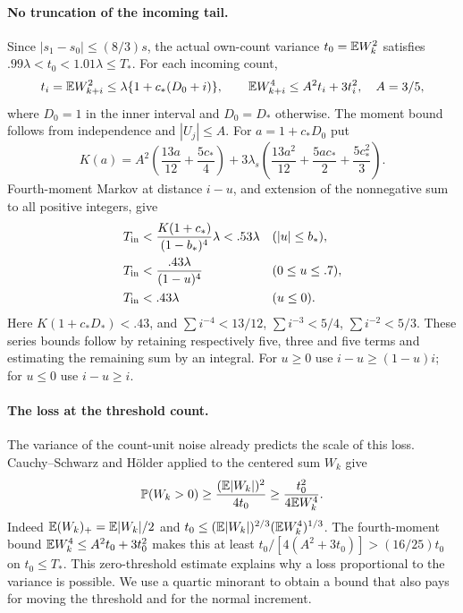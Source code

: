 \paragraph{No truncation of the incoming tail.}
Since $|s_1-s_0|\le(8/3)s$, the actual own-count variance
$t_0=\mathbb E W_k^2$ satisfies
$.99\lambda<t_0<1.01\lambda\le T_*$.
For each incoming count,
\[
 t_i=\mathbb E W_{k+i}^2\le\lambda\{1+c_*(D_0+i)\},\qquad
 \mathbb E W_{k+i}^4\le A^2t_i+3t_i^2,\quad A=3/5,
\]
where $D_0=1$ in the inner interval and $D_0=D_*$ otherwise.
The moment bound follows from independence and $|U_j|\le A$.
For $a=1+c_*D_0$ put
\[
 K(a)=A^2\left(\frac{13a}{12}+\frac{5c_*}{4}\right)
 +3\lambda_s\left(\frac{13a^2}{12}+\frac{5ac_*}{2}+\frac{5c_*^2}{3}\right).
\]
Fourth-moment Markov at distance $i-u$, and extension of the nonnegative
sum to all positive integers, give
\begin{equation}\label{short:count:small-tail}
\begin{aligned}
 T_{\rm in}&<\frac{K(1+c_*)}{(1-b_*)^4}\lambda<.53\lambda
                                      &&(|u|\le b_*),\\
 T_{\rm in}&<\frac{.43\lambda}{(1-u)^4}&&(0\le u\le.7),\\
 T_{\rm in}&<.43\lambda&&(u\le0).
\end{aligned}
\end{equation}
Here $K(1+c_*D_*)<.43$, and
$\sum i^{-4}<13/12$, $\sum i^{-3}<5/4$, $\sum i^{-2}<5/3$.
These series bounds follow by retaining respectively five, three and five
terms and estimating the remaining sum by an integral. For $u\ge0$ use
$i-u\ge(1-u)i$; for $u\le0$ use $i-u\ge i$.

\paragraph{The loss at the threshold count.}
The variance of the count-unit noise already predicts the scale of this
loss. Cauchy--Schwarz and H\"older applied to the centered sum $W_k$ give
\[
 \mathbb P(W_k>0)\ge\frac{(\mathbb E|W_k|)^2}{4t_0}
             \ge\frac{t_0^2}{4\mathbb E W_k^4}.
\]
Indeed $\mathbb E(W_k)_+=\mathbb E|W_k|/2$ and
$t_0\le(\mathbb E|W_k|)^{2/3}(\mathbb E W_k^4)^{1/3}$.
The fourth-moment bound $\mathbb E W_k^4\le A^2t_0+3t_0^2$ makes this at least
$t_0/[4(A^2+3t_0)]> (16/25)t_0$ on $t_0\le T_*$.
This zero-threshold estimate explains why a loss proportional to the
variance is possible. We use a quartic minorant to obtain a bound that
also pays for moving the threshold and for the normal increment.

